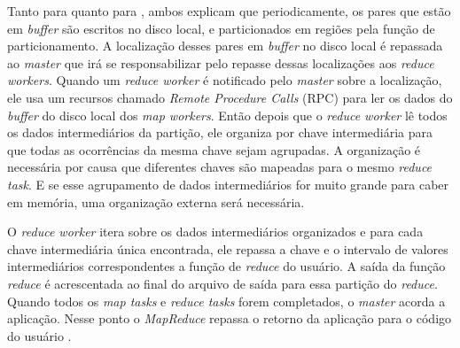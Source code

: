                 Tanto para  quanto para , ambos explicam que periodicamente,
                os pares que estão em \textit{buffer} são escritos no disco local, e particionados em regiões pela função de
                particionamento. A localização desses pares em \textit{buffer} no disco local é repassada ao \textit{master}
                que irá se responsabilizar pelo repasse dessas localizações aos \textit{reduce workers}. Quando um \textit{
                reduce worker} é notificado pelo \textit{master} sobre a localização, ele usa um recursos chamado \textit{
                Remote Procedure Calls} (RPC) para ler os dados do \textit{buffer} do disco local dos \textit{map workers}.
                Então depois que o \textit{reduce worker} lê todos os dados intermediários da partição, ele organiza por
                chave intermediária para que todas as ocorrências da mesma chave sejam agrupadas. A organização é
                necessária por causa que diferentes chaves são mapeadas para o mesmo \textit{reduce task}. E se esse
                agrupamento de dados intermediários for muito grande para caber em memória, uma organização externa
                será necessária.

                O \textit{reduce worker} itera sobre os dados intermediários organizados e para cada chave intermediária
                única encontrada, ele repassa a chave e o intervalo de valores intermediários correspondentes a função de
                \textit{reduce} do usuário. A saída da função \textit{reduce} é acrescentada ao final do arquivo de saída
                para essa partição do \textit{reduce}. Quando todos os \textit{map tasks} e \textit{reduce tasks} forem
                completados, o \textit{master} acorda a aplicação. Nesse ponto o \textit{MapReduce} repassa o retorno
                da aplicação para o código do usuário \cite{dean2008}.

